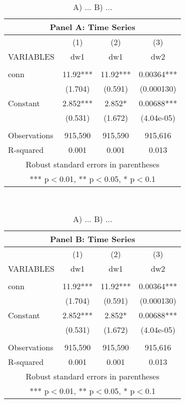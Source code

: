 \documentclass[]{article}
\begin{document}
\begin{table}
\centering
\caption{A) ... B) ...}
\vspace*{10mm}
\begin{tabular}{lccc}
\multicolumn{4}{c}{Panel A: Time Series} \\ \hline
 & (1) & (2) & (3) \\
VARIABLES & dw1 & dw1 & dw2 \\ \hline
 &  &  &  \\
conn & 11.92*** & 11.92*** & 0.00364*** \\
 & (1.704) & (0.591) & (0.000130) \\
Constant & 2.852*** & 2.852* & 0.00688*** \\
 & (0.531) & (1.672) & (4.04e-05) \\
 &  &  &  \\
Observations & 915,590 & 915,590 & 915,616 \\
 R-squared & 0.001 & 0.001 & 0.013 \\ \hline
\multicolumn{4}{c}{ Robust standard errors in parentheses} \\
\multicolumn{4}{c}{ *** p$<$0.01, ** p$<$0.05, * p$<$0.1} \\
\end{tabular}
\\
\vspace*{10mm}
\begin{tabular}{lccc}
\multicolumn{4}{c}{Panel B: Time Series} \\ \hline
 & (1) & (2) & (3) \\
VARIABLES & dw1 & dw1 & dw2 \\ \hline
 &  &  &  \\
conn & 11.92*** & 11.92*** & 0.00364*** \\
 & (1.704) & (0.591) & (0.000130) \\
Constant & 2.852*** & 2.852* & 0.00688*** \\
 & (0.531) & (1.672) & (4.04e-05) \\
 &  &  &  \\
Observations & 915,590 & 915,590 & 915,616 \\
 R-squared & 0.001 & 0.001 & 0.013 \\ \hline
\multicolumn{4}{c}{ Robust standard errors in parentheses} \\
\multicolumn{4}{c}{ *** p$<$0.01, ** p$<$0.05, * p$<$0.1} \\
\end{tabular}
\end{table}
\end{document}
